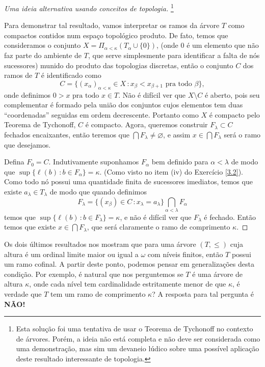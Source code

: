 \documentclass[a4paper]{article}
\begin{document}
    \begin{proof}[Uma ideia alternativa usando conceitos de topologia]
      \footnote{Esta solução foi uma tentativa
    de usar o Teorema de Tychonoff
    no contexto de árvores. Porém, a ideia não está completa e
    não deve ser considerada como uma demonstração, mas sim
    um devaneio lúdico sobre uma possível aplicação deste
    resultado interessante de topologia.}
  
   Para demonstrar tal resultado, vamos interpretar os ramos da árvore \(T\) como
   compactos contidos num espaço topológico produto.
   De fato, temos que consideramos o conjunto \(X=\Pi_{\alpha<\kappa}(T_\alpha\cup\{0\})\),
   (onde \(0\) é um elemento que não faz parte do ambiente de \(T\),
   que serve simplesmente para identificar a falta de nós sucessores) munido do
   produto  das topologias discretas, então o conjunto \(C\) dos ramos de \(T\)
   é identificado como
   \[C=\{(x_\alpha)_{\alpha<\kappa}\in X \,\colon x_\beta<x_{\beta+1}\text{ pra
     todo }\beta\},\] onde definimos \(0>x\text{ pra todo }x\in T\). Não é
 difícil ver que \(X\setminus C\) é aberto, pois seu complementar é formado
 pela união dos conjuntos  cujos elementos tem duas ``coordenadas'' seguidas em
 ordem decrescente.
   Portanto como \(X\) é compacto pelo
   Teorema de Tychonoff, \(C\) é compacto. Agora, queremos construir
   \(F_\lambda\subset C\) fechados encaixantes, então teremos que
   \(\bigcap F_\lambda\neq\varnothing\), e assim \(x\in\bigcap F_\lambda\) será o
   ramo que desejamos.
  
   Defina \(F_0= C\). Indutivamente suponhamos \(F_\alpha\) bem definido
   para \(\alpha<\lambda\) de modo que \mbox{\(\sup\{\ell(b)\,\colon b\in
   F_\alpha\}=\kappa\).} (Como visto no item (iv) do Exercício \ref{3.2}).
   Como todo nó possui uma quantidade  finita de sucessores imediatos, temos que
    existe \(a_\lambda\in T_\lambda\) de modo que quando definimos
   \[F_\lambda=\{(x_\beta)\in C\,\colon
     x_\lambda=a_\lambda\}\bigcap_{\alpha<\lambda} F_\alpha\] temos que
   \(\sup\{\ell(b)\,\colon b\in F_\lambda\}=\kappa\), e não é difícil ver que 
   \(F_\lambda\) é fechado. Então temos que existe \(x\in\bigcap F_\lambda\), que
   será claramente o ramo de comprimento \(\kappa\).
  \end{proof}

  Os dois últimos resultados nos mostram que para uma árvore \((T,\leq)\) cuja altura é um
  ordinal limite maior ou igual a \(\omega\) com níveis finitos, então \(T\)
  possui um ramo cofinal. A partir deste ponto, podemos pensar em generalizações
  desta condição. Por exemplo, é natural que nos perguntemos se $T$ é uma árvore
  de altura $\kappa$, onde cada nível tem cardinalidade estritamente menor de
  que \(\kappa\), é verdade que $T$ tem um
  ramo de comprimento $\kappa$?  A resposta para tal pergunta é \textbf{NÃO!}
\end{document}
